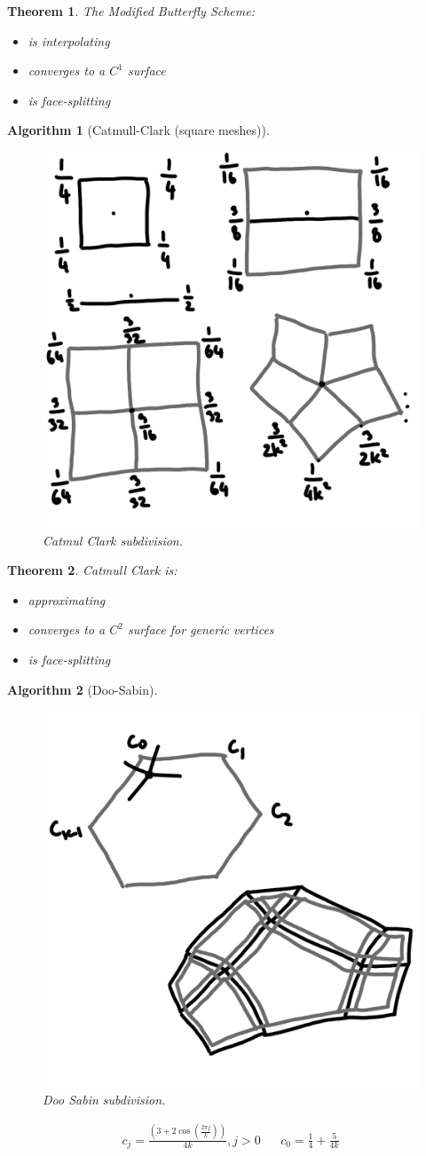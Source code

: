 \documentclass[]{article}
\newtheorem{theorem}{Theorem}
\newtheorem{algorithm}{Algorithm}
\begin{document}
\begin{theorem}
	The Modified Butterfly Scheme:
	\begin{itemize}
		\item is interpolating
		\item converges to a $C^1$ surface
		\item is face-splitting
	\end{itemize}
\end{theorem}

\begin{algorithm}[Catmull-Clark (square meshes)]
	\begin{figure}[h!]
		\centering
		\includegraphics[width=0.3\linewidth]{figures/catmul_clark}
		\caption{Catmul Clark subdivision.}
		\label{fig:catmul_clark}
	\end{figure}
\end{algorithm}

\begin{theorem}
	Catmull Clark is:
	\begin{itemize}
		\item approximating
		\item converges to a $C^2$ surface for generic vertices
		\item is face-splitting
	\end{itemize}
\end{theorem}

\begin{algorithm}[Doo-Sabin]
	\begin{figure}[h!]
		\centering
		\includegraphics[width=0.3\linewidth]{figures/doo_sabin}
		\caption{Doo Sabin subdivision.}
		\label{fig:doo_sabin}
	\end{figure}
	
	\begin{align*}
		c_j = \frac{\left(3+2\cos\left(\frac{2\pi j}{k}\right)\right)}{4k}, j > 0 && c_0 = \frac{1}{4} + \frac{5}{4k}
	\end{align*}
\end{algorithm}
\end{document}
